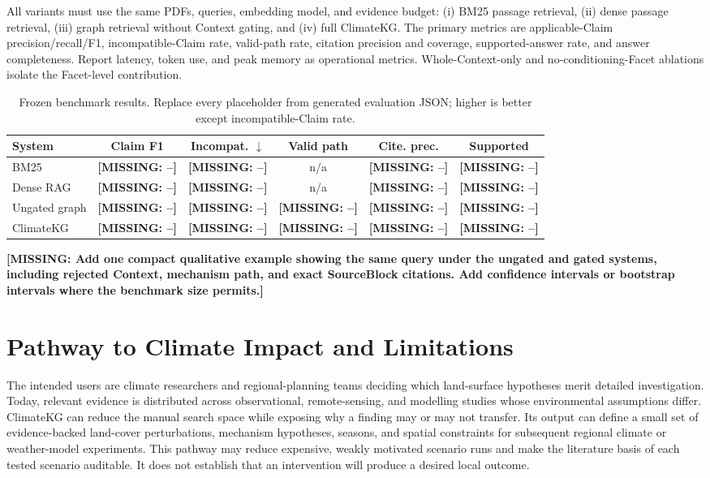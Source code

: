 \documentclass{article}
\newcommand{\missing}[1]{\textcolor{missingred}{\textbf{[MISSING: #1]}}}
\newcommand{\system}{ClimateKG}
\begin{document}
All variants must use the same PDFs, queries, embedding model, and evidence
budget: (i) BM25 passage retrieval, (ii) dense passage retrieval, (iii) graph
retrieval without Context gating, and (iv) full \system{}. The primary metrics
are applicable-Claim precision/recall/F1, incompatible-Claim rate,
valid-path rate, citation precision and coverage, supported-answer rate, and
answer completeness. Report latency, token use, and peak memory as operational
metrics. Whole-Context-only and no-conditioning-Facet ablations isolate the
Facet-level contribution.

\begin{table}[t]
\centering
\scriptsize
\caption{Frozen benchmark results. Replace every placeholder from generated
evaluation JSON; higher is better except incompatible-Claim rate.}
\label{tab:results}
\begin{tabular}{lccccc}
\toprule
System & Claim F1 & Incompat. $\downarrow$ & Valid path & Cite. prec. & Supported \\
\midrule
BM25 & \missing{--} & \missing{--} & n/a & \missing{--} & \missing{--} \\
Dense RAG & \missing{--} & \missing{--} & n/a & \missing{--} & \missing{--} \\
Ungated graph & \missing{--} & \missing{--} & \missing{--} & \missing{--} & \missing{--} \\
\system{} & \missing{--} & \missing{--} & \missing{--} & \missing{--} & \missing{--} \\
\bottomrule
\end{tabular}
\end{table}

\missing{Add one compact qualitative example showing the same query under the
ungated and gated systems, including rejected Context, mechanism path, and exact
SourceBlock citations. Add confidence intervals or bootstrap intervals where
the benchmark size permits.}

\section{Pathway to Climate Impact and Limitations}

The intended users are climate researchers and regional-planning teams deciding
which land-surface hypotheses merit detailed investigation. Today, relevant
evidence is distributed across observational, remote-sensing, and modelling
studies whose environmental assumptions differ. \system{} can reduce the manual
search space while exposing why a finding may or may not transfer. Its output
can define a small set of evidence-backed land-cover perturbations, mechanism
hypotheses, seasons, and spatial constraints for subsequent regional climate or
weather-model experiments. This pathway may reduce expensive, weakly motivated
scenario runs and make the literature basis of each tested scenario auditable.
It does not establish that an intervention will produce a desired local outcome.
\end{document}
